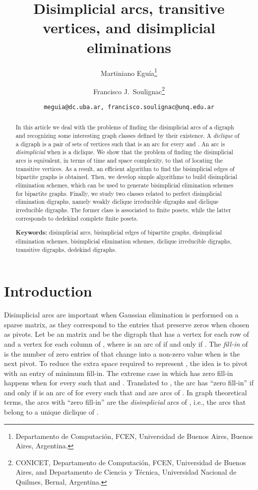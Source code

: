 \documentclass[a4paper,11pt]{article}
\title{Disimplicial arcs, transitive vertices, and disimplicial eliminations}
\author{Martiniano Eguía\thanks{Departamento de Computaci\'on, FCEN, Universidad de Buenos Aires, 
Buenos Aires, Argentina.} \and Francisco J.\ Soulignac\thanks{CONICET, Departamento de Computaci\'on, FCEN, Universidad de Buenos Aires, and Departamento de Ciencia y Técnica, Universidad Nacional de Quilmes, Bernal, Argentina.}}
\date{\normalsize\texttt{meguia@dc.uba.ar, francisco.soulignac@unq.edu.ar}}
\begin{document}
\maketitle

\begin{abstract}
 In this article we deal with the problems of finding the disimplicial arcs of a digraph and recognizing some interesting graph classes defined by their existence.  A \emph{diclique} of a digraph is a pair  of sets of vertices such that  is an arc for every  and .  An arc  is \emph{disimplicial} when  is a diclique.  We show that the problem of finding the disimplicial arcs is equivalent, in terms of time and space complexity, to that of locating the transitive vertices.  As a result, an efficient algorithm to find the bisimplicial edges of bipartite graphs is obtained.  Then, we develop simple algorithms to build disimplicial elimination schemes, which can be used to generate bisimplicial elimination schemes for bipartite graphs.  Finally, we study two classes related to perfect disimplicial elimination digraphs, namely weakly diclique irreducible digraphs and diclique irreducible digraphs.  The former class is associated to finite posets, while the latter corresponds to dedekind complete finite posets.

 \vspace*{.2\baselineskip} {\bf Keywords:} disimplicial arcs, bisimplicial edges of bipartite graphs, disimplicial elimination schemes, bisimplicial elimination schemes, diclique irreducible digraphs, transitive digraphs, dedekind digraphs.
\end{abstract}


\section{Introduction}

Disimplicial arcs are important when Gaussian elimination is performed on a sparse matrix, as they correspond to the entries that preserve zeros when chosen as pivots.  Let  be an  matrix and  be the digraph that has a vertex  for each row of  and a vertex  for each column of , where  is an arc of  if and only if .  The \emph{fill-in} of  is the number of zero entries of  that change into a non-zero value when  is the next pivot.  To reduce the extra space required to represent , the idea is to pivot with an entry of minimum fill-in.   The extreme case in which  has zero fill-in happens when  for every  such that  and .  Translated to , the arc  has ``zero fill-in'' if and only if  is an arc of  for every  such that  and  are arcs of .  In graph theoretical terms, the arcs with ``zero fill-in'' are the \emph{disimplicial} arcs of , i.e., the arcs that belong to a unique diclique of .
\end{document}
